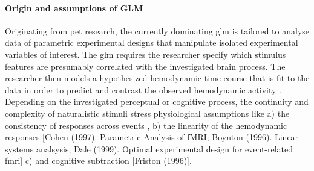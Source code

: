 \paragraph{Origin and assumptions of GLM}


%
Originating from \ac{pet} research, the currently dominating \ac{glm} is
tailored to analyse data of parametric experimental designs that
manipulate isolated experimental variables of interest.
%
The \ac{glm} requires the researcher specify which stimulus features are
presumably correlated with the investigated brain process.
%
The researcher then models a hypothesized hemodynamic time course that is fit to
the data in order to predict and contrast the observed hemodynamic activity
\citep{friston1998event}.
%
Depending on the investigated perceptual or cognitive process, the continuity
and complexity of naturalistic stimuli stress physiological assumptions like
%
a) the consistency of responses across events \citep[the basis for
\textit{trial-averaging};][]{dale1997selective},
%
b) the linearity of the hemodynamic responses [Cohen (1997). Parametric Analysis
of fMRI; Boynton (1996). Linear systems analsysis; Dale (1999). Optimal
experimental design for event-related fmri]%
c) and cognitive subtraction [Friston (1996)].


